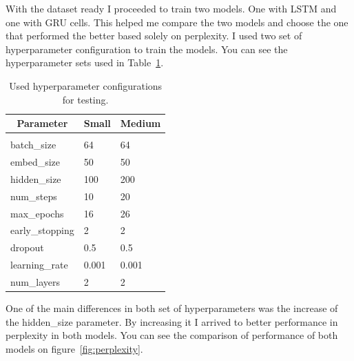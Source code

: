 \documentclass{article} %
\begin{document}
With the dataset ready I proceeded to train two models. One with LSTM and one
with GRU cells. This helped me compare the two models and choose the one that
performed the better based solely on perplexity. I used two set of
hyperparameter configuration to train the models. You can see the
hyperparameter sets used in Table~\ref{table:hyperparameters}.

\begin{table}[h]
\caption{Used hyperparameter configurations for testing.}
\label{table:hyperparameters}
\centering
\begin{tabular}{lll}
\multicolumn{1}{c}{\bf Parameter}  &\multicolumn{1}{c}{\bf Small}
&\multicolumn{1}{c}{\bf Medium}
\\ \hline \\
batch\_size         &64         &64 \\
embed\_size         &50         &50 \\
hidden\_size        &100        &200 \\
num\_steps          &10         &20 \\
max\_epochs         &16         &26 \\
early\_stopping     &2          &2 \\
dropout             &0.5        &0.5 \\
learning\_rate      &0.001      &0.001 \\
num\_layers         &2          &2 \\
\end{tabular}
\end{table}

One of the main differences in both set of hyperparameters was the increase of
the hidden\_size parameter. By increasing it I arrived to better performance in
perplexity in both models. You can see the comparison of performance of both
models on figure~\ref{fig:perplexity}.
\end{document}
